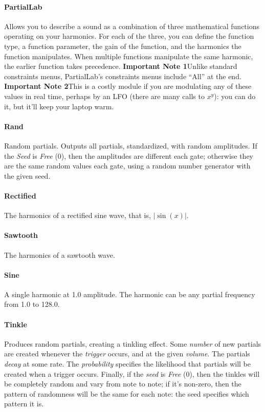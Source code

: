 \documentclass{article}
\begin{document}
\paragraph{PartialLab}  Allows you to describe a sound as a combination of three mathematical functions operating on your harmonics.  For each of the three, you can define the function type, a function parameter, the gain of the function, and the harmonics the function manipulates.  When multiple functions manipulate the same harmonic, the earlier function takes precedence.  {\bf Important Note 1}\quad Unlike standard constraints menus, PartialLab's constraints menus include ``All'' at the end.  {\bf Important Note 2}\quad This is a costly module if you are modulating any of these values in real time, perhaps by an LFO (there are many calls to \(x^y\)): you can do it, but it'll keep your laptop warm.

\paragraph{Rand}  Random partials.  Outputs all partials, standardized, with random amplitudes.  If the {\it Seed} is {\it Free} (0), then the amplitudes are different each gate; otherwise they are the same random values each gate, using a random number generator with the given seed.

\paragraph{Rectified}  The harmonics of a rectified sine wave, that is, \(|\sin(x)|\).

\paragraph{Sawtooth}  The harmonics of a sawtooth wave.

\paragraph{Sine}  A single harmonic at 1.0 amplitude.  The harmonic can be any partial frequency from 1.0 to 128.0.

\paragraph{Tinkle}  Produces random partials, creating a tinkling effect.  Some {\it number} of new partials are created whenever the {\it trigger} occurs, and at the given {\it volume}.  The partials {\it decay} at some rate.  The {\it probability} specifies the likelihood that partials will be created when a trigger occurs.   Finally, if the {\it seed} is {\it Free} (0), then the tinkles will be completely random and vary from note to note; if it's non-zero, then the pattern of randomness will be the same for each note: the seed specifies which pattern it is.
\end{document}
